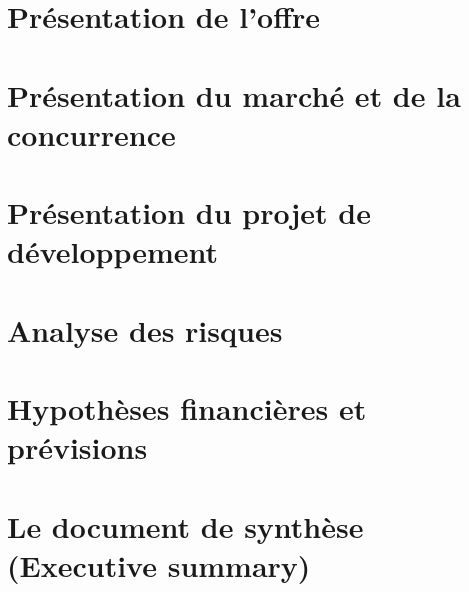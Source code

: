 \documentclass[a4paper,12pt]{report}
\begin{document}
%

\section{Présentation de l'offre}
\section{Présentation du marché et de la concurrence}
\section{Présentation du projet de développement}
\section{Analyse des risques}
\section{Hypothèses financières et prévisions}
\section{Le document de synthèse (Executive summary)}
\end{document}
